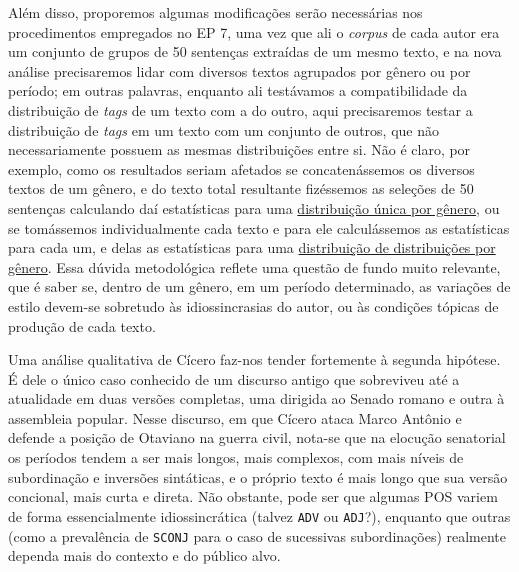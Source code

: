 \documentclass[10pt,a4paper,onecolumn]{article}
\theoremstyle{definition}
\theoremstyle{remark}
\begin{document}
Além disso, proporemos algumas modificações serão necessárias nos procedimentos empregados no EP 7, uma vez que ali o \emph{corpus} de cada autor era um conjunto de grupos de 50 sentenças extraídas de um mesmo texto, e na nova análise precisaremos lidar com diversos textos agrupados por gênero ou por período; em outras palavras, enquanto ali testávamos a compatibilidade da distribuição de \emph{tags} de um texto com a do outro, aqui precisaremos testar a distribuição de \emph{tags} em um texto com um conjunto de outros, que não necessariamente possuem as mesmas distribuições entre si. Não é claro, por exemplo, como os resultados seriam afetados se concatenássemos os diversos textos de um gênero, e do texto total resultante fizéssemos as seleções de 50 sentenças calculando daí estatísticas para uma \underline{distribuição única por gênero}, ou se tomássemos individualmente cada texto e para ele calculássemos as estatísticas para cada um, e delas as estatísticas para uma \underline{distribuição de distribuições por gênero}. Essa dúvida metodológica reflete uma questão de fundo muito relevante, que é saber se, dentro de um gênero, em um período determinado, as variações de estilo devem-se sobretudo às idiossincrasias do autor, ou às condições tópicas de produção de cada texto.

Uma análise qualitativa de Cícero faz-nos tender fortemente à segunda hipótese. É dele o único caso conhecido de um discurso antigo que sobreviveu até a atualidade em duas versões completas, uma dirigida ao Senado romano e outra à assembleia popular. Nesse discurso, em que Cícero ataca Marco Antônio e defende a posição de Otaviano na guerra civil, nota-se que na elocução senatorial os períodos tendem a ser mais longos, mais complexos, com mais níveis de subordinação e inversões sintáticas, e o próprio texto é mais longo que sua versão concional, mais curta e direta. Não obstante, pode ser que algumas POS variem de forma essencialmente idiossincrática (talvez \texttt{ADV} ou \texttt{ADJ}?), enquanto que outras (como a prevalência de \texttt{SCONJ} para o caso de sucessivas subordinações) realmente dependa mais do contexto e do público alvo.
\end{document}
